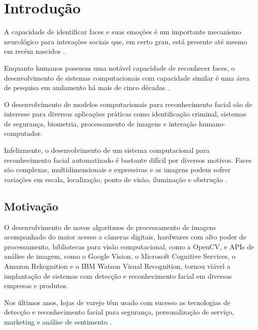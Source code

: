 \chapter*{Introdução}

A capacidade de identificar faces e suas emoções é um importante mecanismo neurológico para interações sociais que, em certo grau, está presente até mesmo em recém nascidos \cite{morton1991conspec, fantz1961origin}.

Enquanto humanos possuem uma notável capacidade de reconhecer faces, o desenvolvimento de sistemas computacionais com capacidade similar é uma área de pesquisa em andamento há mais de cinco décadas \cite{bledsoe1964facial, chan1965man, bledsoe1966man, bledsoe1966model, boyer1991biographical, kelly1970visual, kanade1973picture}.

O desenvolvimento de modelos computacionais para reconhecimento facial são de interesse para diversas aplicações práticas como identificação criminal, sistemas de segurança, biometria, processamento de imagens e interação humano-computador.

Infelizmente, o desenvolvimento de um sistema computacional para reconhecimento facial automatizado é bastante difícil por diversos motivos. Faces são complexas, multidimensionais e expressivas \cite{turk1991eigenfaces} e as imagens podem sofrer variações em escala, localização, ponto de visão, iluminação e obstrução \cite{censtudy}.

\section*{Motivação}\label{sec:motivacao}

O desenvolvimento de novos algoritmos de processamento de imagens acompanhado do maior acesso a câmeras digitais, hardwares com alto poder de processamento, bibliotecas para visão computacional, como a OpenCV, e APIs de análise de imagem, como o Google Vision, o Microsoft Cognitive Services, o Amazon Rekognition e o IBM Watson Visual Recognition, tornou viável a implantação de sistemas com detecção e reconhecimento facial em diversas empresas e produtos.

Nos últimos anos, lojas de varejo têm usado com sucesso as tecnologias de detecção e reconhecimento facial para segurança, personalização de serviço, marketing e análise de sentimento \cite{fortune2015walmart, consumer2015facial, exame2018pontofrio, 2017recfacial, 2015bbcfacewatch}.

